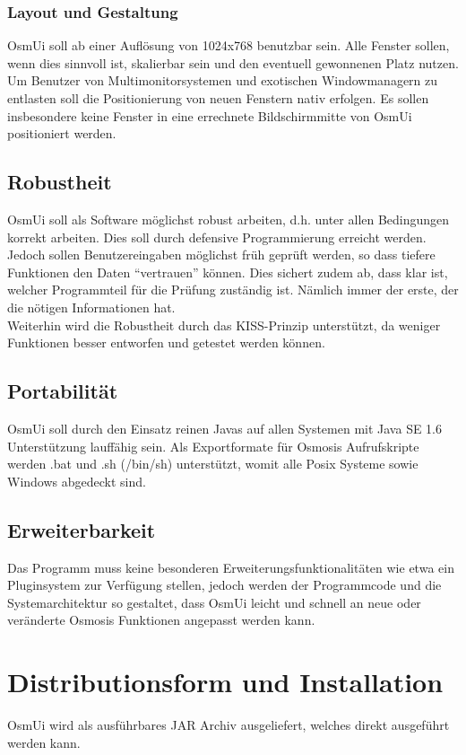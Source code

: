 \documentclass[a4paper,10pt]{scrartcl}
\begin{document}
\subsubsection{Layout und Gestaltung}
OsmUi soll ab einer Auflösung von 1024x768 benutzbar sein. Alle Fenster sollen, wenn dies sinnvoll ist, skalierbar sein und den eventuell gewonnenen Platz
nutzen. Um Benutzer von Multimonitorsystemen und exotischen Windowmanagern zu entlasten soll die Positionierung von neuen Fenstern nativ erfolgen. Es
sollen insbesondere keine Fenster in eine errechnete Bildschirmmitte von OsmUi positioniert werden.
\subsection{Robustheit}
OsmUi soll als Software möglichst robust arbeiten, d.h. unter allen Bedingungen korrekt arbeiten. Dies soll durch defensive Programmierung erreicht werden.
Jedoch sollen Benutzereingaben möglichst früh geprüft werden, so dass tiefere Funktionen den Daten ``vertrauen'' können. Dies sichert zudem ab, dass klar ist, welcher
Programmteil für die Prüfung zuständig ist. Nämlich immer der erste, der die nötigen Informationen hat.\\
Weiterhin wird die Robustheit durch das KISS-Prinzip unterstützt, da weniger Funktionen besser entworfen und getestet werden können.
\subsection{Portabilität}
OsmUi soll durch den Einsatz reinen Javas auf allen Systemen mit Java SE 1.6 Unterstützung lauffähig sein. Als Exportformate für Osmosis Aufrufskripte
werden .bat und .sh (/bin/sh) unterstützt, womit alle Posix Systeme sowie Windows abgedeckt sind.
\subsection{Erweiterbarkeit}
Das Programm muss keine besonderen Erweiterungsfunktionalitäten wie etwa ein Pluginsystem zur Verfügung stellen, jedoch werden der Programmcode und die Systemarchitektur
so gestaltet, dass OsmUi leicht und schnell an neue oder veränderte Osmosis Funktionen angepasst werden kann.
\section{Distributionsform und Installation}
OsmUi wird als ausführbares JAR Archiv ausgeliefert, welches direkt ausgeführt werden kann.
\end{document}
